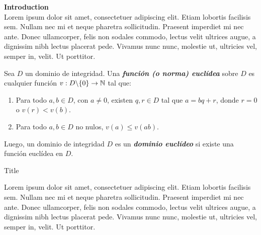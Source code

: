 \begin{frame}[plain]
    \begingroup
        \selectfont
        \Huge\color{black}\textbf{Introduction}\\[0.6em]
    \endgroup
    \begingroup
        Lorem ipsum dolor sit amet, consectetuer adipiscing elit.
        Etiam lobortis facilisis sem. Nullam nec mi et neque
        pharetra sollicitudin. Praesent imperdiet mi nec ante. Donec
        ullamcorper, felis non sodales commodo, lectus velit ultrices
        augue, a dignissim nibh lectus placerat pede. Vivamus nunc
        nunc, molestie ut, ultricies vel, semper in, velit. Ut porttitor.
    \endgroup
\end{frame}


\begin{frame}[plain]
    \begin{bee}[Definición]
        Sea $D$ un dominio de integridad. Una \textbf{\textit{función (o norma) euclídea}} sobre $D$ es cualquier función $v:D\backslash\{0\}\rightarrow\mathbb{N}$ tal que:
            \begin{enumerate}[1)]
                \item Para todo $a,b\in D$, con $a\neq 0$, existen $q,r\in D$ tal que $a=bq+r$, donde $r=0$ o $v(r)<v(b)$.
                \item Para todo $a,b\in D$ no nulos, $v(a)\leq v(ab)$.
            \end{enumerate}
        Luego, un dominio de integridad $D$ es un \textbf{\textit{dominio euclídeo}} si existe una función euclídea en $D$.
    \end{bee} 
\end{frame}

\begin{frame}{Title}
    \begin{bee}[]
        Lorem ipsum dolor sit amet, consectetuer adipiscing elit.
        Etiam lobortis facilisis sem. Nullam nec mi et neque
        pharetra sollicitudin. Praesent imperdiet mi nec ante. Donec
        ullamcorper, felis non sodales commodo, lectus velit ultrices
        augue, a dignissim nibh lectus placerat pede. Vivamus nunc
        nunc, molestie ut, ultricies vel, semper in, velit. Ut porttitor.
    \end{bee}
\end{frame}

